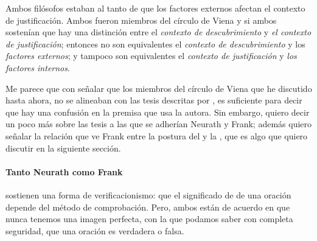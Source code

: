 Ambos filósofos estaban al tanto de que los factores externos afectan el contexto de justificación.
Ambos fueron miembros del círculo de Viena y si ambos sostenían que hay una distinción entre el \emph{contexto de descubrimiento} y \emph{el contexto de justificación}; entonces no son equivalentes el \emph{contexto de descubrimiento} y los \emph{factores externos}; y  tampoco son equivalentes el \emph{contexto de justificación} y \emph{los factores internos}.

Me parece que con señalar que los miembros del círculo de Viena que he discutido hasta ahora, no se alineaban con las tesis descritas por \parencite{Yturbe1995}, es suficiente para decir que hay una confusión en la premisa que usa la autora.
Sin embargo, quiero decir un poco más sobre las tesis a las que se adherían Neurath y Frank; además quiero señalar la relación que ve Frank entre la postura del  y la , que es algo que quiero discutir en la siguiente sección.

\paragraph{Tanto Neurath como Frank} sostienen una forma de verificacionismo: que el significado de de una oración depende del método de comprobación.
Pero, ambos están de acuerdo en que nunca tenemos una imagen perfecta, con la que podamos saber con completa seguridad, que una oración es verdadera o falsa.






